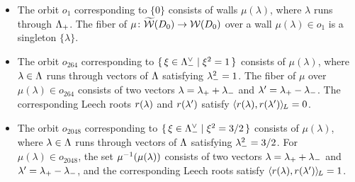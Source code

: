 \documentclass{amsart} %
\begin{document}
\begin{itemize}
\item[($1$)]
The orbit $o_1$ corresponding to $\{0\}$
consists of walls $\mu(\lambda)$,
where $\lambda$ runs through $\Lambda_{+}$.
The fiber of $\mu\colon \widetilde{\mathord{\mathcal{W}}}(D_0)\to\mathord{\mathcal{W}}(D_0)$ 
over a wall $\mu(\lambda)\in o_1$ is a singleton $\{\lambda\}$.
%
\item[($264$)]
The orbit $o_{264}$ corresponding to $\{\,{\xi\in \Lambda_{-}^{\vee}}\mid {\xi^2=1} \,\}$
consists of $\mu(\lambda)$,
where $\lambda\in \Lambda$ runs through
vectors of $\Lambda$ satisfying ${\lambda}_{-}^2=1$.
The fiber of $\mu$ 
over $\mu(\lambda)\in o_{264}$ consists 
of two vectors
$\lambda={\lambda}_{+}+{\lambda}_{-}$ and $\lambda^{\prime}={\lambda}_{+}-{\lambda}_{-}$.
The corresponding Leech roots 
$r(\lambda)$ and $r(\lambda^{\prime})$ satisfy
$\langle r(\lambda), r(\lambda^{\prime}) \rangle_{\hskip -1pt L}=0$.
%
\item[($2048$)]
The orbit $o_{2048}$ corresponding to $\{\,{\xi\in \Lambda_{-}^{\vee}}\mid {\xi^2=3/2} \,\}$
consists of $\mu(\lambda)$,
where $\lambda\in \Lambda$ runs through
vectors of $\Lambda$ satisfying ${\lambda}_{-}^2=3/2$.
For $\mu(\lambda)\in o_{2048}$, the set
 $\mu^{-1}(\mu(\lambda))$ consists 
of two vectors
$\lambda={\lambda}_{+}+{\lambda}_{-}$ and $\lambda^{\prime}={\lambda}_{+}-{\lambda}_{-}$, and 
the corresponding Leech roots 
 satisfy
$\langle r(\lambda), r(\lambda^{\prime}) \rangle_{\hskip -1pt L}=1$.

\end{itemize}
%
\end{document}
